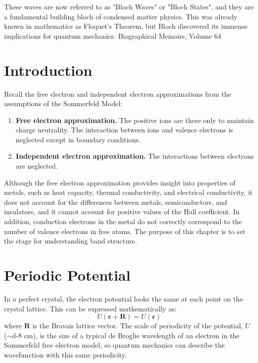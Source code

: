 These waves are now referred to as "Bloch Waves" or "Bloch States", and they are a fundamental building bloch of condensed matter physics. This was already known in mathematics as Floquet's Theorem, but Bloch discovered its immense implications for quantum mechanics.
Biographical Memoirs, Volume 64

\section{Introduction}
	Recall the free electron and independent electron approximations from the assumptions of the Sommerfeld Model:

	\begin{enumerate}
		\item \textbf{Free electron approximation.} The positive ions are there only to maintain charge neutrality. The interaction between ions and valence electrons is neglected except in boundary conditions.
		\item \textbf{Independent electron approximation.} The interactions between electrons are neglected.
	\end{enumerate}


	Although the free electron approximation provides insight into properties of metals, such as heat capacity, thermal conductivity, and electrical conductivity, it does not account for the differences between metals, semiconductors, and insulators, and it cannot account for positive values of the Hall coefficient. In addition, conduction electrons in the metal do not correctly correspond to the number of valence electrons in free atoms. The purpose of this chapter is to set the stage for understanding band structure.

\section{Periodic Potential}


	In a perfect crystal, the electron potential looks the same at each point on the crystal lattice. This can be expressed mathematically as:
	\begin{equation} \label{eq:U_period}
		U(\boldsymbol{r} + \boldsymbol{R}) = U(\boldsymbol{r})
	\end{equation}
	where $\boldsymbol{R}$ is the Bravais lattice vector. The scale of periodicity of the potential, $U$ ($\sim$\num{d-8} cm), is the size of a typical de Broglie wavelength of an electron in the Sommerfeld free electron model, so quantum mechanics can describe the wavefunction with this same periodicity. 

